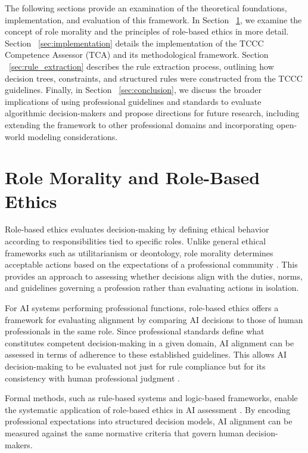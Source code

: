 \documentclass[conference]{IEEEtran}
\begin{document}
The following sections provide an examination of the theoretical foundations, implementation, and evaluation of this framework.
In Section ~\ref{sec:role_morality}, we examine the concept of role morality and the principles of role-based ethics in more detail. Section ~\ref{sec:implementation} details the implementation of the TCCC Competence Assessor (TCA) and its methodological framework. Section ~\ref{sec:rule_extraction} describes the rule extraction process, outlining how decision trees, constraints, and structured rules were constructed from the TCCC guidelines. Finally, in Section ~\ref{sec:conclusion}, we discuss the broader implications of using professional guidelines and standards to evaluate algorithmic decision-makers and propose directions for future research, including extending the framework to other professional domains and incorporating open-world modeling considerations.
% 
\section{Role Morality and Role-Based Ethics}
\label{sec:role_morality}
Role-based ethics evaluates decision-making by defining ethical behavior according to responsibilities tied to specific roles. Unlike general ethical frameworks such as utilitarianism or deontology, role morality determines acceptable actions based on the expectations of a professional community \cite{dawson_professional_1994}. This provides an approach to assessing whether decisions align with the duties, norms, and guidelines governing a profession rather than evaluating actions in isolation.

For AI systems performing professional functions, role-based ethics offers a framework for evaluating alignment by comparing AI decisions to those of human professionals in the same role. Since professional standards define what constitutes competent decision-making in a given domain, AI alignment can be assessed in terms of adherence to these established guidelines. This allows AI decision-making to be evaluated not just for rule compliance but for its consistency with human professional judgment \cite{dubber_oxford_2020}.

Formal methods, such as rule-based systems and logic-based frameworks, enable the systematic application of role-based ethics in AI assessment \cite{wotawa_model-based_2022, sarmiento_action_2023}. By encoding professional expectations into structured decision models, AI alignment can be measured against the same normative criteria that govern human decision-makers.
\end{document}
